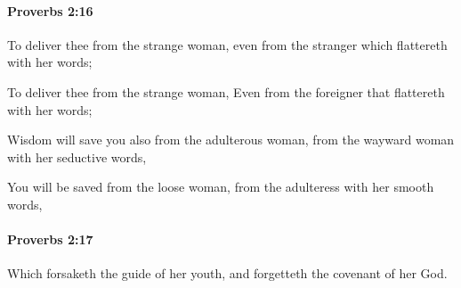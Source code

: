 		\paragraph{Proverbs 2:16} %
			\label{PROVERBS-2-16}

			To deliver thee from the strange woman, even from the stranger which flattereth with her words;

			\begin{versebox}
					\item[BHS] 
					\item[ASV] To deliver thee from the strange woman, Even from the foreigner that flattereth with her words;
					\item[NIV] Wisdom will save you also from the adulterous woman, from the wayward woman with her seductive words,
					\item[NRSV] You will be saved from the loose woman, from the adulteress with her smooth words,
			\end{versebox}

		\paragraph{Proverbs 2:17} %
			\label{PROVERBS-2-17}

			Which forsaketh the guide of her youth, and forgetteth the covenant of her God.

